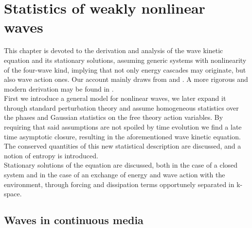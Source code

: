 \newpage
\phantom{}
\thispagestyle{empty}
\section{Statistics of weakly nonlinear waves}
This chapter is devoted to the derivation and analysis of the wave kinetic equation and its stationary solutions, assuming generic systems with nonlinearity of the four-wave kind, implying that not only energy cascades may originate, but also wave action ones. Our account mainly draws from \cite{Onorato2020} and 
\cite{Zakharov}. A more rigorous and modern derivation may be found in \cite{Nazarenko2011}. \\
First we introduce a general model for nonlinear waves, we later expand it through standard perturbation theory and assume homogeneous statistics over the phases 
and Gaussian statistics on the free theory action variables. By requiring that said assumptions are not spoiled by time evolution we find a late time asymptotic closure, 
resulting in the aforementioned wave kinetic equation. The conserved quantities of this new statistical description are discussed, and a notion of entropy is introduced. \\
Stationary solutions of the equation are discussed, both in the case of a closed system and  in the case of an exchange of energy 
and wave action with the environment, through forcing and dissipation terms opportunely separated in k-space.\\ 

\subsection{Waves in continuous media}

